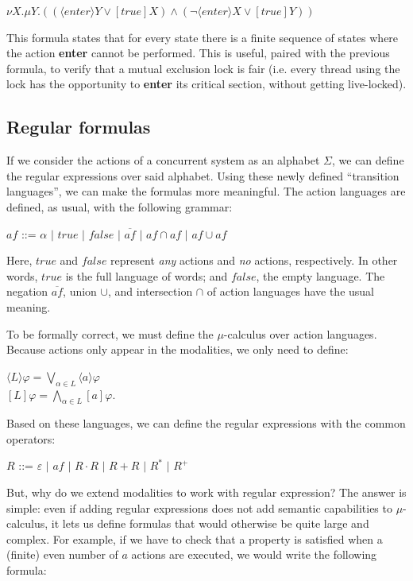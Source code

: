 \documentclass[11pt]{article}
\theoremstyle{definition}
\theoremstyle{plain}
\let\temp\phi
\let\phi\varphi
\let\varphi\temp
\begin{document}
\begin{center}
	$ \nu X. \mu Y. ((\langle enter\rangle Y \vee [true]X) \wedge (\neg \langle enter \rangle X \vee [true] Y)) $
\end{center}

This formula states that for every state there is a finite sequence of states where the action \textbf{enter} cannot be performed. This is useful, paired with the previous formula, to verify that a mutual exclusion lock is fair (i.e. every thread using the lock has the opportunity to \textbf{enter} its critical section, without getting live-locked).

\subsection{Regular formulas}
If we consider the actions of a concurrent system as an alphabet $\Sigma$, we can define the regular expressions over said alphabet. Using these newly defined “transition languages”, we can make the formulas more meaningful.
The action languages are defined, as usual, with the following grammar:
\begin{center}
	$ af $ ::= $\alpha$ $ \vert $ $true$ $ \vert $ $false$ $ \vert $ $ \overline{af}$ $ \vert $ $af \cap af $ $ \vert $ $af \cup af$
\end{center}
Here, $ true $ and $ false $ represent \emph{any} actions and \emph{no} actions, respectively. In other words, $ true $ is the full language of words; and $ false $, the empty language. The negation $ \overline{af} $, union $ \cup $, and intersection $ \cap $ of action languages have the usual meaning.

To be formally correct, we must define the $ \mu $-calculus over action languages. Because actions only appear in the modalities, we only need to define:
\begin{center}
	$ \langle L\rangle\phi = \bigvee_{\alpha\in L} \langle a\rangle\phi $\\
	$ [L]\phi = \bigwedge_{\alpha\in L}[a]\phi $.
\end{center}
Based on these languages, we can define the regular expressions with the common operators:
\begin{center}
	$ R $ ::= $\varepsilon$ $ \vert $ $af$ $ \vert $ $R\cdot R$ $ \vert $ $ R + R$ $ \vert $ $R^* $ $ \vert $ $R^+$
\end{center}

But, why do we extend modalities to work with regular expression? The answer is simple: even if adding regular expressions does not add semantic capabilities to $ \mu $-calculus, it lets us define formulas that would otherwise be quite large and complex. For example, if we have to check that a property is satisfied when a (finite) even number of $ a $ actions are executed, we would write the following formula:
\end{document}
